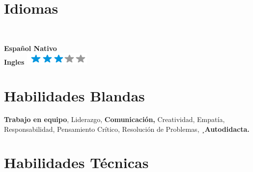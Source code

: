 \documentclass[american]{cv-class}
\begin{document}
\begin{aside}
    
    \section{Idiomas}
    \\
    \begin{small}
    \textbf{{Español Nativo} 	{}}
    \\
    \textbf{{Ingles  \hspace{1.2cm}    } {\raisebox{-0.35ex} {\includegraphics[scale=0.67]{img/stars/3stars.png}}}}

    \end{small}
	
\section{Habilidades Blandas}

	\justifying
    \begin{small}
    	{ \textbf{Trabajo en equipo}, Liderazgo, \textbf{Comunicación,} Creatividad, Empatía, Responsabilidad, Pensamiento Crítico, Resolución de Problemas, ¸\textbf{Autodidacta.}
    	}
    \end{small}
    \newpage
\section{Habilidades Técnicas}

	\justifying
    \begin{small}
    

\end{small}
\end{aside}
\end{document}
